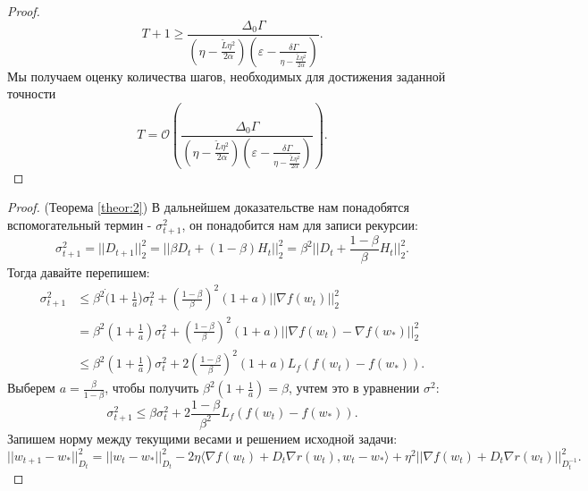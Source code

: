 \begin{proof}
\begin{equation*}
\end{equation*}
\begin{equation*}
    T + 1 \geq \frac{\Delta_0 \Gamma}{(\eta - \frac{\tilde{L}\eta^2}{2\alpha}) \left( \varepsilon -\frac{\delta\Gamma}{\eta - \frac{\tilde{L}\eta^2}{2\alpha}}\right)}.
\end{equation*}
Мы получаем оценку количества шагов, необходимых для достижения заданной точности
\begin{equation*}
      T = \mathcal{O}\left( \frac{\Delta_0 \Gamma}{(\eta - \frac{\tilde{L}\eta^2}{2\alpha}) \left( \varepsilon -\frac{\delta\Gamma}{\eta - \frac{\tilde{L}\eta^2}{2\alpha}}\right)} \right).
\end{equation*}
\end{proof}

\begin{proof} (Теорема \ref{theor:2})
В дальнейшем доказательстве нам понадобятся вспомогательный термин - $\sigma_{t+1}^2$, он понадобится нам для записи рекурсии:
\begin{equation*}
    \sigma_{t+1}^2 = ||D_{t+1}||_2^2 = ||\beta D_{t} + (1-\beta) H_t ||_2^2 =\beta^2 ||D_{t} +\frac{1-\beta}{\beta}H_t||_2^2.
\end{equation*}
Тогда давайте перепишем:
\begin{equation*}
\begin{split}
    \sigma_{t+1}^2 &\leq \beta^2 \dot (1+\frac{1}{a}) \sigma_{t}^2 + \left(\frac{1-\beta}{\beta}\right)^2(1+a)||\nabla f(w_t)||_2^2 \\ 
    & =  \beta^2 (1+\frac{1}{a})\sigma_{t}^2 + \left(\frac{1-\beta}{\beta} \right)^2(1+a) ||\nabla f(w_t) - \nabla f(w_*)||_2^2  \\
    & \leq \beta^2(1+\frac{1}{a})\sigma_{t}^2 + 2\left(\frac{1-\beta}{\beta} \right)^2(1+a)L_f (f(w_t) - f(w_*)).
    \end{split}
\end{equation*}
Выберем $a = \frac{\beta}{1-\beta}$, чтобы получить $\beta^2(1+\frac{1}{a}) = \beta$, учтем это в уравнении $\sigma^2$:
\begin{equation*}
    \sigma_{t+1}^2 \leq \beta \sigma_{t}^2 + 2\frac{1-\beta}{\beta^2}L_f (f(w_t) - f(w_*)).
\end{equation*}
Запишем норму между текущими весами и решением исходной задачи:
\begin{equation*}
    ||w_{t+1}-w_*||_{D_t}^2 = ||w_t - w_*||_{D_t}^2 - 2 \eta \langle \nabla f(w_t) + D_t \nabla r(w_t), w_t - w_* \rangle + \eta^2 ||\nabla f(w_t) +D_t \nabla r(w_t)||_{D_t^{-1}}^2.

\end{equation*}
\end{proof}

